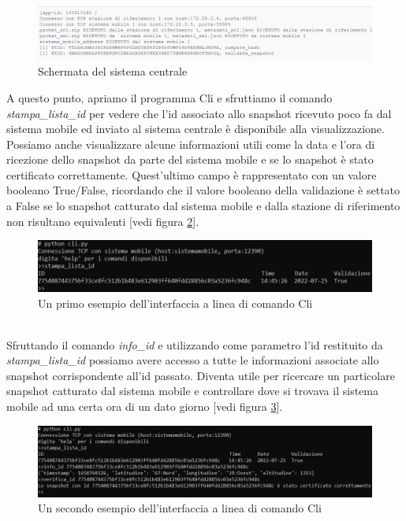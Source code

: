 \begin{figure}[!h]
\flushleft
\includegraphics[scale=0.8]{images/simulazione/sistema_centrale.png}
\caption{Schermata del sistema centrale}
\label{fig: sistema_centrale7 }
\end{figure}
A questo punto, apriamo il programma Cli e sfruttiamo il comando \textit{stampa\_lista\_id} per vedere che l'id associato allo snapshot ricevuto poco fa dal sistema mobile ed inviato al sistema centrale è disponibile alla visualizzazione. Possiamo anche visualizzare alcune informazioni utili come la data e l'ora di ricezione dello snapshot da parte del sistema mobile e se lo snapshot è stato certificato correttamente. Quest'ultimo campo è rappresentato con un valore booleano True/False, ricordando che il valore booleano della validazione è settato a False se lo snapshot catturato dal sistema mobile e dalla stazione di riferimento non risultano equivalenti [vedi figura \ref{fig: sistema_centrale8 }].
\begin{figure}[!h]
\flushleft
\includegraphics[scale=0.8]{images/simulazione/cli1.png}
\caption{Un primo esempio dell'interfaccia a linea di comando Cli}
\label{fig: sistema_centrale8 }
\end{figure}\\
Sfruttando il comando \textit{info\_id} e utilizzando come parametro l'id restituito da \textit{stampa\_lista\_id} possiamo avere accesso a tutte le informazioni associate allo snapshot corrispondente all'id passato. Diventa utile per ricercare un particolare snapshot catturato dal sistema mobile e controllare dove si trovava il sistema mobile ad una certa ora di un dato giorno [vedi figura \ref{fig: sistema_centrale9 }].
\begin{figure}[!h]
\flushleft
\includegraphics[scale=0.7]{images/simulazione/cli2.png}
\caption{Un secondo esempio dell'interfaccia a linea di comando Cli}
\label{fig: sistema_centrale9 }
\end{figure}